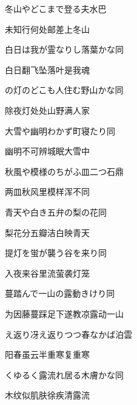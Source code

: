\begin{haiku}
    {\FH 冬山やどこまで登る夫}\hfill{\FH 水巴}

    {\FK 未知行何处邮差上冬山}
\end{haiku}

\begin{haiku}
    {\FH 白日は我が霊なりし落葉かな}\hfill{\FH 同}

    {\FK 白日翻飞坠落叶是我魂}
\end{haiku}

\begin{haiku}
    {\FH {}の灯のどこも人住む野山かな}\hfill{\FH 同}

    {\FK 除夜灯处处山野满人家}
\end{haiku}

\begin{haiku}
    {\FH 大雪や幽明わかず町寝たり}\hfill{\FH 同}

    {\FK 幽明不可辨城眠大雪中}
\end{haiku}

\begin{haiku}
    {\FH 秋風や模様のちがふ皿二つ}\hfill{\FH 石鼎}

    {\FK 两皿秋风里模样浑不同}
\end{haiku}

\begin{haiku}
    {\FH 青天や白き五弁の梨の花}\hfill{\FH 同}

    {\FK 梨花分五瓣洁白映青天}
\end{haiku}

\begin{haiku}
    {\FH 提灯を蛍が襲う谷を来り}\hfill{\FH 同}

    {\FK 入夜来谷里流萤袭灯笼}
\end{haiku}

\begin{haiku}
    {\FH 蔓踏んで一山の露動きけり}\hfill{\FH 同}

    {\FK 为因藤蔓踩足下遂教凉露动一山}
\end{haiku}

\begin{haiku}
    {\FH {}え返り冴え返りつつ春なかば}\hfill{\FH 泊雲}

    {\FK 阳春虽云半重寒复重寒}
\end{haiku}

\begin{haiku}
    {\FH {}くゆるく露流れ居る木膚かな}\hfill{\FH 同}

    {\FK 木纹似肌肤徐疾清露流}
\end{haiku}

